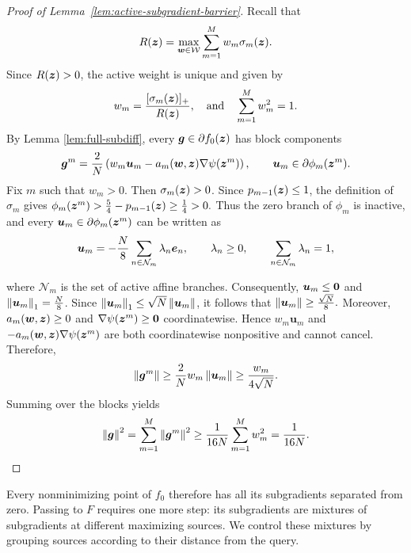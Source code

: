 \begin{proof}[Proof of Lemma~\ref{lem:active-subgradient-barrier}]
Recall that
\[
 R(\bm{z})
 =
 \max_{\bm{w}\in\mathcal W}
 \sum_{m=1}^M w_m\sigma_m(\bm{z}).
\]
Since \(R(\bm{z})>0\), the active weight is unique and given by
\[
 w_m
 =
 \frac{[\sigma_m(\bm{z})]_+}{R(\bm{z})},
 \quad \text{and} \quad
 \sum_{m=1}^Mw_m^2=1.
\]
By Lemma \ref{lem:full-subdiff}, every
\(\bm{g}\in\partial{f_0} (\bm{z})\) has block components
\[
 \bm{g}^m
 =
 \frac2N
 \left(
   w_m\bm{u}_m
   -
   a_m(\bm{w}{,\bm{z}})\nabla\psi(\bm{z}^m)
 \right),
 \qquad
 \bm{u}_m\in\partial\phi_{m}(\bm{z}^m).
\]
Fix \(m\) such that \(w_m>0\). Then \(\sigma_m(\bm{z})>0\). Since
\({p_{m-1}(\bm{z})\leq1}\), the definition of \(\sigma_m\) gives
$
 \phi_{m}(\bm{z}^m)
 >
 \tfrac54-{p_{m-1}(\bm{z})}
 \geq
 \tfrac14
 >0.
$
Thus the zero branch of \({\phi_m}\) is inactive, and every
\(\bm{u}_m\in\partial\phi_{m}(\bm{z}^m)\) can be written as
\[
 \bm{u}_m
 =
 -\frac N8
 \sum_{n\in\mathcal N_m}\lambda_n \bm{e}_n,
 \qquad
 \lambda_n\geq0,
 \qquad
 \sum_{n\in\mathcal N_m}\lambda_n=1,
\]

where \(\mathcal N_m\) is the set of active affine branches.  Consequently,
$ \bm{u}_m\leq{\mathbf 0}$ and $ \left\lVert \bm{u}_m\right\rVert_1=\frac N8$.
Since \(\left\lVert \bm{u}_m\right\rVert_1\leq\sqrt N\left\lVert \bm{u}_m\right\rVert\), it follows that
$
 \left\lVert \bm{u}_m\right\rVert\geq\tfrac{\sqrt N}{8}.
$
Moreover, \(a_m(\bm{w}{,\bm{z}})\geq0\) and
\(\nabla\psi(\bm{z}^m)\geq{\mathbf 0}\) coordinatewise. Hence
\(w_m\bm{u}_m\) and \(-a_m(\bm{w}{,\bm{z}})\nabla\psi(\bm{z}^m)\) are both
coordinatewise nonpositive and cannot cancel. Therefore,
\[
 \left\lVert \bm{g}^m\right\rVert
 \geq
 \frac2Nw_m\left\lVert \bm{u}_m\right\rVert
 \geq
 \frac{w_m}{4\sqrt N}.
\]
Summing over the blocks yields
\[
 \left\lVert \bm{g}\right\rVert^2
 =
 \sum_{m=1}^M\left\lVert \bm{g}^m\right\rVert^2
 \geq
 \frac1{16N}\sum_{m=1}^Mw_m^2
 =
 \frac1{16N}.
\]
\end{proof}

Every nonminimizing point of $f_0$ therefore has all its
subgradients separated from zero. Passing to $F$ requires one
more step: its subgradients are mixtures of subgradients at
different maximizing sources. We control these mixtures by
grouping sources according to their distance from the query.

